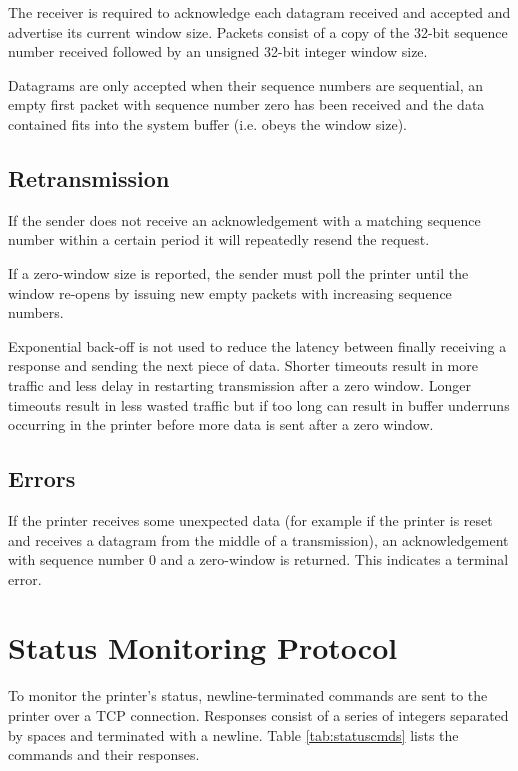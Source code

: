			The receiver is required to acknowledge each datagram received and
			accepted and advertise its current window size. Packets consist of a copy
			of the 32-bit sequence number received followed by an unsigned 32-bit
			integer window size.
			
			Datagrams are only accepted when their sequence numbers are sequential, an
			empty first packet with sequence number zero has been received and the
			data contained fits into the system buffer (i.e. obeys the window size).
			
		\subsection{Retransmission}
			
			If the sender does not receive an acknowledgement with a matching sequence
			number within a certain period it will repeatedly resend the request.
			
			If a zero-window size is reported, the sender must poll the printer until
			the window re-opens by issuing new empty packets with increasing sequence
			numbers.
			
			Exponential back-off is not used to reduce the latency between finally
			receiving a response and sending the next piece of data. Shorter timeouts
			result in more traffic and less delay in restarting transmission after a
			zero window. Longer timeouts result in less wasted traffic but if too long
			can result in buffer underruns occurring in the printer before more data
			is sent after a zero window.
			
		\subsection{Errors}
			
			If the printer receives some unexpected data (for example if the printer
			is reset and receives a datagram from the middle of a transmission), an
			acknowledgement with sequence number 0 and a zero-window is returned. This
			indicates a terminal error.
			
	\section{Status Monitoring Protocol}
		
		\label{sec:statusSpec}
		
		To monitor the printer's status, newline-terminated commands are sent to the
		printer over a TCP connection. Responses consist of a series of integers
		separated by spaces and terminated with a newline. Table
		\ref{tab:statuscmds} lists the commands and their responses.
		

